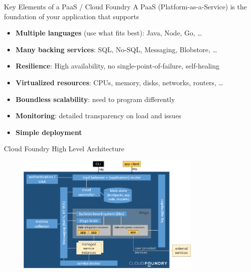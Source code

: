 \begin{frame}{Key Elements of a PaaS / Cloud Foundry}
	A PaaS (Platform-as-a-Service) is the foundation of your application that supports
	\begin{itemize}[<+->]
		\item \textbf{Multiple languages} (use what fits best): Java, Node, Go, \dots
		\item \textbf{Many backing services}: SQL, No-SQL, Messaging, Blobstore, \dots
		\item \textbf{Resilience}: High availability, no single-point-of-failure, self-healing
		\item \textbf{Virtualized resources}: CPUs, memory, disks, networks, routers, \dots
		\item \textbf{Boundless scalability}: need to program differently
		\item \textbf{Monitoring}: detailed transparency on load and issues
		\item \textbf{Simple deployment}
	\end{itemize}
\end{frame}


\begin{frame}{Cloud Foundry High Level Architecture}
\vspace{-5mm}
  \begin{figure}
    \includegraphics[width=0.8\textwidth]{../CloudFoundryBasics//images/CF_HL_Architecture}
  \end{figure}
\vspace{-5mm}
\vfill
\tiny
{}
\\

\end{frame}


